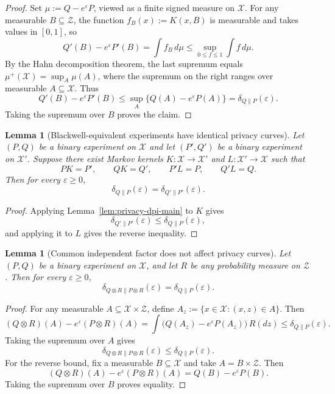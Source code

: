 \documentclass{article}
\newtheorem{lemma}[theorem]{Lemma}
\newcommand{\1}{\mathbf 1}
\begin{document}
\begin{proof}
Set $\mu:=Q-e^\varepsilon P$, viewed as a finite signed measure on $\mathcal X$. For any measurable
$B\subseteq\mathcal Z$, the function $f_B(x):=K(x,B)$ is measurable and takes values in $[0,1]$, so
\[
Q'(B)-e^\varepsilon P'(B)=\int f_B\,d\mu
\le \sup_{0\le f\le 1}\int f\,d\mu.
\]
By the Hahn decomposition theorem, the last supremum equals $\mu^+(\mathcal X)=\sup_A \mu(A)$, where the
supremum on the right ranges over measurable $A\subseteq\mathcal X$. Thus
\[
Q'(B)-e^\varepsilon P'(B)\le \sup_A\{Q(A)-e^\varepsilon P(A)\}
=\delta_{Q\|P}(\varepsilon).
\]
Taking the supremum over $B$ proves the claim.
\end{proof}

\begin{lemma}[Blackwell-equivalent experiments have identical privacy curves]
\label{lem:privacy-blackwell-equivalence}
Let $(P,Q)$ be a binary experiment on $\mathcal X$ and let $(P',Q')$ be a binary experiment on $\mathcal X'$.
Suppose there exist Markov kernels $K:\mathcal X\to\mathcal X'$ and $L:\mathcal X'\to\mathcal X$ such that
\[
PK=P',
\qquad
QK=Q',
\qquad
P'L=P,
\qquad
Q'L=Q.
\]
Then for every $\varepsilon\ge 0$,
\[
\delta_{Q\|P}(\varepsilon)=\delta_{Q'\|P'}(\varepsilon).
\]
\end{lemma}

\begin{proof}
Applying Lemma~\ref{lem:privacy-dpi-main} to $K$ gives
\[
\delta_{Q'\|P'}(\varepsilon)\le \delta_{Q\|P}(\varepsilon),
\]
and applying it to $L$ gives the reverse inequality.
\end{proof}

\begin{lemma}[Common independent factor does not affect privacy curves]
\label{lem:common-independent-factor-main}
Let $(P,Q)$ be a binary experiment on $\mathcal X$, and let $R$ be any probability measure on $\mathcal Z$.
Then for every $\varepsilon\ge 0$,
\[
\delta_{Q\otimes R\|P\otimes R}(\varepsilon)=\delta_{Q\|P}(\varepsilon).
\]
\end{lemma}

\begin{proof}
For any measurable $A\subseteq \mathcal X\times\mathcal Z$, define $A_z:=\{x\in\mathcal X:(x,z)\in A\}$. Then
\[
(Q\otimes R)(A)-e^\varepsilon(P\otimes R)(A)
=
\int \bigl(Q(A_z)-e^\varepsilon P(A_z)\bigr)\,R(dz)
\le \delta_{Q\|P}(\varepsilon).
\]
Taking the supremum over $A$ gives
\[
\delta_{Q\otimes R\|P\otimes R}(\varepsilon)\le \delta_{Q\|P}(\varepsilon).
\]
For the reverse bound, fix a measurable $B\subseteq\mathcal X$ and take $A=B\times\mathcal Z$. Then
\[
(Q\otimes R)(A)-e^\varepsilon(P\otimes R)(A)=Q(B)-e^\varepsilon P(B).
\]
Taking the supremum over $B$ proves equality.
\end{proof}
\end{document}
